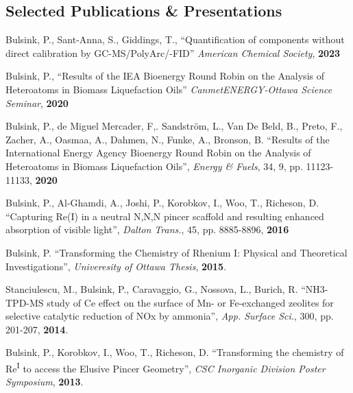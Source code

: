 \documentclass[margin,line]{resume}
\begin{document}
\begin{resume}
    \section{\mysidestyle Selected Publications \& Presentations}
    Bulsink, P., Sant-Anna, S., Giddings, T., ``Quantification of components without direct calibration by GC-MS/PolyArc\textsuperscript \textregistered /-FID'' \textit{American Chemical Society}, \textbf{2023}

    \vspace{0mm}
    Bulsink, P., ``Results of the IEA Bioenergy Round Robin on the Analysis of Heteroatoms in Biomass Liquefaction Oils'' \textit{CanmetENERGY-Ottawa Science Seminar}, \textbf{2020}

    \vspace{0mm}
    Bulsink, P., de Miguel Mercader, F,. Sandstr\"{o}m, L., Van De Beld, B., Preto, F., Zacher, A., Oasmaa, A., Dahmen, N., Funke, A., Bronson, B. ``Results of the International Energy Agency Bioenergy Round Robin on the Analysis of Heteroatoms in Biomass Liquefaction Oils'', \textit{Energy \& Fuels}, 34, 9, pp. 11123-11133, \textbf{2020}
    
    \vspace{0mm}
    Bulsink, P., Al-Ghamdi, A., Joshi, P., Korobkov, I., Woo, T., Richeson, D. ``Capturing Re(I) in a neutral N,N,N pincer scaffold and resulting enhanced absorption of visible light'', \textit{Dalton Trans.}, 45, pp. 8885-8896, \textbf{2016}
    	
     \vspace{0mm}
    Bulsink, P. ``Transforming the Chemistry of Rhenium I: Physical and Theoretical Investigations'', \textit{Univeresity of Ottawa Thesis}, \textbf{2015}.

 	\vspace{0mm}
    Stanciulescu, M., Bulsink, P., Caravaggio, G., Nossova, L., Burich, R. ``NH3-TPD-MS study of Ce effect on the surface of Mn- or Fe-exchanged zeolites for selective catalytic reduction of NOx by ammonia'', \textit{App. Surface Sci.}, 300, pp. 201-207, \textbf{2014}.

	\vspace{0mm}
    Bulsink, P., Korobkov, I., Woo, T., Richeson, D. ``Transforming the chemistry of Re\textsuperscript{I} to access the Elusive Pincer Geometry'', \textit{CSC Inorganic Division Poster Symposium}, \textbf{2013}.


\end{resume}
\end{document}
